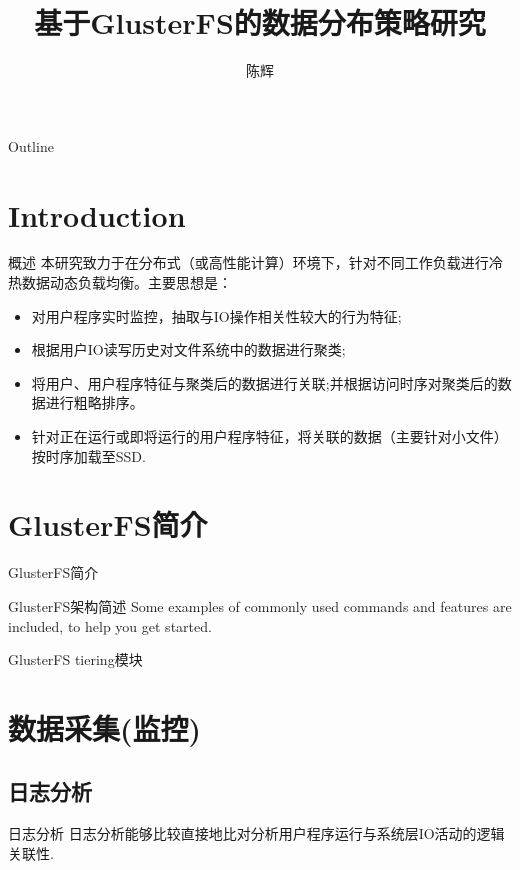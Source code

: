 \documentclass[xelatex]{beamer}
\title[Your Short Title]{基于GlusterFS的数据分布策略研究}
\author{陈辉}
\date{}
\begin{document}
\begin{frame}
  \titlepage
\end{frame}

\begin{frame}{Outline}
  \tableofcontents
\end{frame}
\section{Introduction}
\begin{frame}{概述}
本研究致力于在分布式（或高性能计算）环境下，针对不同工作负载进行冷热数据动态负载均衡。主要思想是：
\begin{itemize}
\item 对用户程序实时监控，抽取与IO操作相关性较大的行为特征;
\item 根据用户IO读写历史对文件系统中的数据进行聚类;
\item 将用户、用户程序特征与聚类后的数据进行关联;并根据访问时序对聚类后的数据进行粗略排序。
\item 针对正在运行或即将运行的用户程序特征，将关联的数据（主要针对小文件）按时序加载至SSD.
\end{itemize}
\end{frame}



\section{GlusterFS简介}

\begin{frame}{GlusterFS简介}

\begin{block}{GlusterFS架构简述}
Some examples of commonly used commands and features are included, to help you get started.
\end{block}

\begin{block}{GlusterFS tiering模块}
\end{block}
\end{frame}

\section{数据采集(监控)}
\subsection{日志分析}
\begin{frame}{日志分析}
日志分析能够比较直接地比对分析用户程序运行与系统层IO活动的逻辑关联性.

\end{frame}
\end{document}
